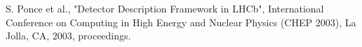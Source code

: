 \documentclass[10pt,a4paper]{article}
\begin{document}
\newpage
\begin{thebibliography}{9}
 S. Ponce et al., 
                "Detector Description Framework in LHCb", 
                International Conference on Computing in High Energy and Nuclear Physics  (CHEP 2003), 
                La Jolla, CA, 2003, proceedings. 
\end{thebibliography}
\end{document}

